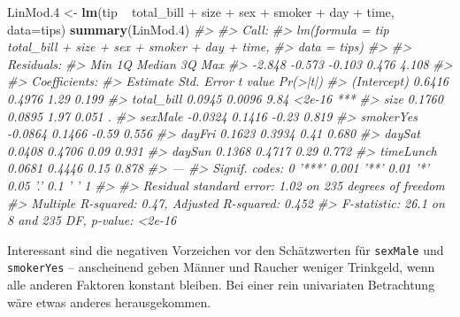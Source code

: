 \documentclass[12pt,ngerman,]{book}
\newenvironment{Shaded}{\begin{snugshade}}{\end{snugshade}}
\newcommand{\KeywordTok}[1]{\textcolor[rgb]{0.13,0.29,0.53}{\textbf{{#1}}}}
\newcommand{\DataTypeTok}[1]{\textcolor[rgb]{0.13,0.29,0.53}{{#1}}}
\newcommand{\FloatTok}[1]{\textcolor[rgb]{0.00,0.00,0.81}{{#1}}}
\newcommand{\StringTok}[1]{\textcolor[rgb]{0.31,0.60,0.02}{{#1}}}
\newcommand{\CommentTok}[1]{\textcolor[rgb]{0.56,0.35,0.01}{\textit{{#1}}}}
\newcommand{\NormalTok}[1]{{#1}}
\renewenvironment{Shaded}{\begin{kframe}}{\end{kframe}}
\begin{document}
\begin{Shaded}
\begin{Highlighting}[]
\NormalTok{LinMod}\FloatTok{.4} \NormalTok{<-}\StringTok{ }\KeywordTok{lm}\NormalTok{(tip ~}\StringTok{ }\NormalTok{total_bill +}\StringTok{ }\NormalTok{size +}\StringTok{ }\NormalTok{sex  +}\StringTok{ }\NormalTok{smoker +}\StringTok{ }\NormalTok{day +}\StringTok{ }\NormalTok{time, }\DataTypeTok{data=}\NormalTok{tips)}
\KeywordTok{summary}\NormalTok{(LinMod}\FloatTok{.4}\NormalTok{)}
\CommentTok{#> }
\CommentTok{#> Call:}
\CommentTok{#> lm(formula = tip ~ total_bill + size + sex + smoker + day + time, }
\CommentTok{#>     data = tips)}
\CommentTok{#> }
\CommentTok{#> Residuals:}
\CommentTok{#>    Min     1Q Median     3Q    Max }
\CommentTok{#> -2.848 -0.573 -0.103  0.476  4.108 }
\CommentTok{#> }
\CommentTok{#> Coefficients:}
\CommentTok{#>             Estimate Std. Error t value Pr(>|t|)    }
\CommentTok{#> (Intercept)   0.6416     0.4976    1.29    0.199    }
\CommentTok{#> total_bill    0.0945     0.0096    9.84   <2e-16 ***}
\CommentTok{#> size          0.1760     0.0895    1.97    0.051 .  }
\CommentTok{#> sexMale      -0.0324     0.1416   -0.23    0.819    }
\CommentTok{#> smokerYes    -0.0864     0.1466   -0.59    0.556    }
\CommentTok{#> dayFri        0.1623     0.3934    0.41    0.680    }
\CommentTok{#> daySat        0.0408     0.4706    0.09    0.931    }
\CommentTok{#> daySun        0.1368     0.4717    0.29    0.772    }
\CommentTok{#> timeLunch     0.0681     0.4446    0.15    0.878    }
\CommentTok{#> ---}
\CommentTok{#> Signif. codes:  0 '***' 0.001 '**' 0.01 '*' 0.05 '.' 0.1 ' ' 1}
\CommentTok{#> }
\CommentTok{#> Residual standard error: 1.02 on 235 degrees of freedom}
\CommentTok{#> Multiple R-squared:  0.47,   Adjusted R-squared:  0.452 }
\CommentTok{#> F-statistic: 26.1 on 8 and 235 DF,  p-value: <2e-16}
\end{Highlighting}
\end{Shaded}

Interessant sind die negativen Vorzeichen vor den Schätzwerten für
\texttt{sexMale} und \texttt{smokerYes} -- anscheinend geben Männer und
Raucher weniger Trinkgeld, wenn alle anderen Faktoren konstant bleiben.
Bei einer rein univariaten Betrachtung wäre etwas anderes
herausgekommen.
\end{document}
